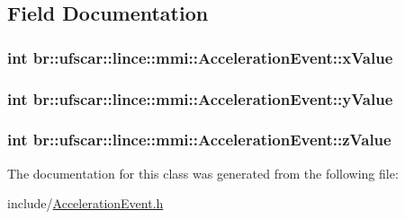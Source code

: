 \subsection{Field Documentation}
\hypertarget{classbr_1_1ufscar_1_1lince_1_1mmi_1_1AccelerationEvent_aa8aa3708d87ebf38147a09b4d83eb604}{
\subsubsection[{xValue}]{\setlength{\rightskip}{0pt plus 5cm}int {\bf br::ufscar::lince::mmi::AccelerationEvent::xValue}}}
\label{classbr_1_1ufscar_1_1lince_1_1mmi_1_1AccelerationEvent_aa8aa3708d87ebf38147a09b4d83eb604}
\hypertarget{classbr_1_1ufscar_1_1lince_1_1mmi_1_1AccelerationEvent_a1b87b4708c1f8ce65293b7fc3a148183}{
\subsubsection[{yValue}]{\setlength{\rightskip}{0pt plus 5cm}int {\bf br::ufscar::lince::mmi::AccelerationEvent::yValue}}}
\label{classbr_1_1ufscar_1_1lince_1_1mmi_1_1AccelerationEvent_a1b87b4708c1f8ce65293b7fc3a148183}
\hypertarget{classbr_1_1ufscar_1_1lince_1_1mmi_1_1AccelerationEvent_a2fea6058c45c23e43ce8eb6f829a4990}{
\subsubsection[{zValue}]{\setlength{\rightskip}{0pt plus 5cm}int {\bf br::ufscar::lince::mmi::AccelerationEvent::zValue}}}
\label{classbr_1_1ufscar_1_1lince_1_1mmi_1_1AccelerationEvent_a2fea6058c45c23e43ce8eb6f829a4990}


The documentation for this class was generated from the following file:\begin{DoxyCompactItemize}
\item 
include/\hyperlink{AccelerationEvent_8h}{AccelerationEvent.h}\end{DoxyCompactItemize}
